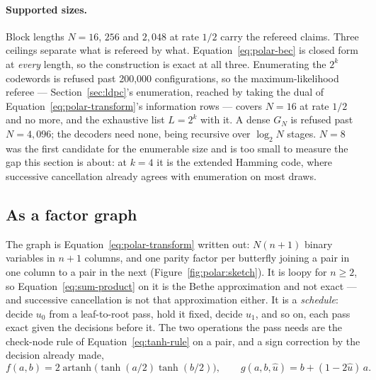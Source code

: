 \documentclass[11pt,a4paper]{article}
\begin{document}
\paragraph{Supported sizes.}
\label{par:polar:sizes}
Block lengths $N = 16$, $256$ and $2{,}048$ at rate $1/2$ carry the refereed
claims. Three ceilings separate what is refereed by what.
Equation~\ref{eq:polar-bec} is closed form at \emph{every} length, so the
construction is exact at all three. Enumerating the $2^{k}$ codewords is
refused past 200,000 configurations, so the maximum-likelihood referee ---
Section~\ref{sec:ldpc}'s enumeration, reached by taking the dual of
Equation~\ref{eq:polar-transform}'s information rows --- covers $N = 16$ at
rate $1/2$ and no more, and the exhaustive list $L = 2^{k}$ with it. A dense
$G_N$ is refused past $N = 4{,}096$; the decoders need none, being recursive
over $\log_2 N$ stages. $N = 8$ was the first candidate for the enumerable
size and is too small to measure the gap this section is about: at $k = 4$ it
is the extended Hamming code, where successive cancellation already agrees
with enumeration on most draws.

\subsection{As a factor graph}
The graph is Equation~\ref{eq:polar-transform} written out: $N(n+1)$ binary
variables in $n+1$ columns, and one parity factor per butterfly joining a pair
in one column to a pair in the next (Figure~\ref{fig:polar:sketch}). It is
loopy for $n \ge 2$, so Equation~\ref{eq:sum-product} on it is the Bethe
approximation and not exact --- and successive cancellation is not that
approximation either. It is a \emph{schedule}: decide $u_0$ from a
leaf-to-root pass, hold it fixed, decide $u_1$, and so on, each pass exact
given the decisions before it. The two operations the pass needs are the
check-node rule of Equation~\ref{eq:tanh-rule} on a pair, and a sign
correction by the decision already made,
\begin{equation}
  f(a, b) = 2 \operatorname{artanh}\!\big(\tanh(a/2)\tanh(b/2)\big),
  \qquad g(a, b, \hat u) = b + (1 - 2\hat u)\, a.
  \label{eq:polar-fg}
\end{equation}


\end{document}
